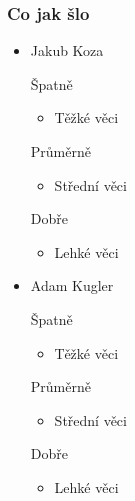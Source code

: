 \documentclass{beamer}
\begin{document}
\begin{frame}[allowframebreaks]\frametitle{Co jak šlo}
  \begin{itemize}
    \item Jakub Koza
     \begin{block}{Špatně} %
       \begin{itemize}
        \item Těžké věci
       \end{itemize}
     \end{block}
     \begin{block}{Průměrně} %
        \begin{itemize}
        \item Střední věci
       \end{itemize}
     \end{block}
     \begin{block}{Dobře} %
       \begin{itemize}
        \item Lehké věci
       \end{itemize}
     \end{block}
   
    \item Adam Kugler
      \begin{block}{Špatně} %
       \begin{itemize}
        \item Těžké věci
       \end{itemize}
     \end{block}
     \begin{block}{Průměrně} %
        \begin{itemize}
        \item Střední věci
       \end{itemize}
     \end{block}
     \begin{block}{Dobře} %
       \begin{itemize}
        \item Lehké věci
       \end{itemize}
     \end{block}
  

\end{itemize}
\end{frame}
\end{document}
